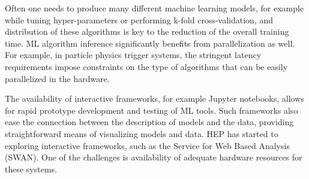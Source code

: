 Often one needs to produce many different machine learning models, for example while tuning hyper-parameters or performing k-fold cross-validation, and distribution of these algorithms is key to the reduction of the overall training time.
ML algorithm inference significantly benefits from parallelization as well. For example, in particle physics trigger systems, the stringent latency requirements impose constraints on the type of algorithms that can be easily parallelized in the hardware.

The availability of interactive frameworks, for example Jupyter notebooks, allows for rapid prototype development and testing of ML tools. Such frameworks also ease the connection between the description of models and the data, providing straightforward means of visualizing models and data.
HEP has started to exploring interactive frameworks, such as the Service for Web Based Analysis (SWAN). One of the challenges is availability of adequate hardware resources for these systems.



